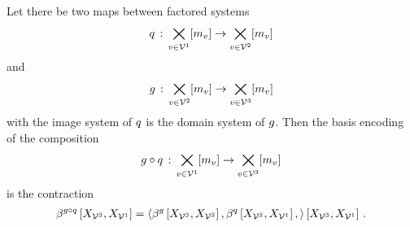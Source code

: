 \begin{theorem}
    \label{the:compositionByContraction}
    Let there be two maps between factored systems
    \begin{align*}
        q \,:\, \bigtimes_{v\in\mathcal{V}^{1}}[m_{v}] \rightarrow \bigtimes_{v\in\mathcal{V}^{2}}[m_{v}]
    \end{align*}
    and
    \begin{align*}
        g \,:\, \bigtimes_{v\in\mathcal{V}^{2}}[m_{v}] \rightarrow \bigtimes_{v\in\mathcal{V}^{3}}[m_{v}]
    \end{align*}
    with the image system of $q$ is the domain system of $g$.
    Then the basis encoding of the composition
    \begin{align*}
        {g}\circ{q}\,:\, \bigtimes_{v\in\mathcal{V}^{1}}[m_{v}] \rightarrow \bigtimes_{v\in\mathcal{V}^{3}}[m_{v}]
    \end{align*}
    is the contraction
    \begin{align*}
        \beta^{{g}\circ{q}}\left[X_{\mathcal{V}^{3}},X_{\mathcal{V}^{1}}\right]
        = \left\langle 
            \beta^{g}\left[X_{\mathcal{V}^{3}},X_{\mathcal{V}^{2}}\right],
            \beta^{q}\left[X_{\mathcal{V}^{2}},X_{\mathcal{V}^{1}}\right],
        \right\rangle \left[ X_{\mathcal{V}^{3}},X_{\mathcal{V}^{1}} \right] \, .
    \end{align*}
\end{theorem}
